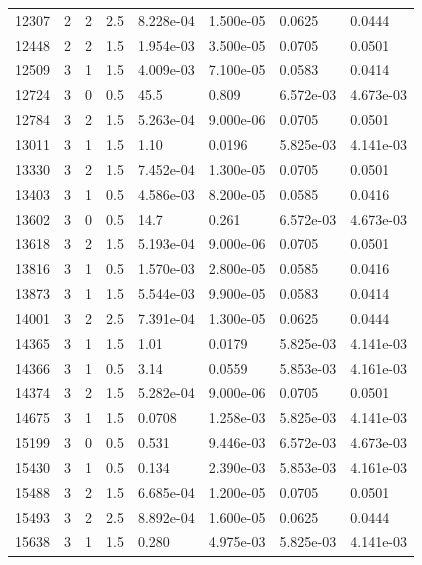 \documentclass[preview]{standalone}
\begin{document}
{{{\begin{tabular}{L{1.2cm}C{1.2cm} C{0.3cm}C{0.5cm} C{1.4cm}C{1.4cm} C{1.4cm}C{1.4cm}}
  12307  &     2  & 2     & 2.5 &  8.228e-04  & 1.500e-05  & 0.0625 &  0.0444   \\ 
  12448  &     2  & 2     & 1.5 &  1.954e-03  & 3.500e-05  & 0.0705 &  0.0501   \\ 
  12509  &     3  & 1     & 1.5 &  4.009e-03  & 7.100e-05  & 0.0583 &  0.0414   \\ 
  12724  &     3  & 0     & 0.5 &  45.5  & 0.809  & 6.572e-03 &  4.673e-03   \\ 
  12784  &     3  & 2     & 1.5 &  5.263e-04  & 9.000e-06  & 0.0705 &  0.0501   \\ 
  13011  &     3  & 1     & 1.5 &  1.10  & 0.0196  & 5.825e-03 &  4.141e-03   \\ 
  13330  &     3  & 2     & 1.5 &  7.452e-04  & 1.300e-05  & 0.0705 &  0.0501   \\ 
  13403  &     3  & 1     & 0.5 &  4.586e-03  & 8.200e-05  & 0.0585 &  0.0416   \\ 
  13602  &     3  & 0     & 0.5 &  14.7  & 0.261  & 6.572e-03 &  4.673e-03   \\ 
  13618  &     3  & 2     & 1.5 &  5.193e-04  & 9.000e-06  & 0.0705 &  0.0501   \\ 
  13816  &     3  & 1     & 0.5 &  1.570e-03  & 2.800e-05  & 0.0585 &  0.0416   \\ 
  13873  &     3  & 1     & 1.5 &  5.544e-03  & 9.900e-05  & 0.0583 &  0.0414   \\ 
  14001  &     3  & 2     & 2.5 &  7.391e-04  & 1.300e-05  & 0.0625 &  0.0444   \\ 
  14365  &     3  & 1     & 1.5 &  1.01  & 0.0179  & 5.825e-03 &  4.141e-03   \\ 
  14366  &     3  & 1     & 0.5 &  3.14  & 0.0559  & 5.853e-03 &  4.161e-03   \\ 
  14374  &     3  & 2     & 1.5 &  5.282e-04  & 9.000e-06  & 0.0705 &  0.0501   \\ 
  14675  &     3  & 1     & 1.5 &  0.0708  & 1.258e-03  & 5.825e-03 &  4.141e-03   \\ 
  15199  &     3  & 0     & 0.5 &  0.531  & 9.446e-03  & 6.572e-03 &  4.673e-03   \\ 
  15430  &     3  & 1     & 0.5 &  0.134  & 2.390e-03  & 5.853e-03 &  4.161e-03   \\ 
  15488  &     3  & 2     & 1.5 &  6.685e-04  & 1.200e-05  & 0.0705 &  0.0501   \\ 
  15493  &     3  & 2     & 2.5 &  8.892e-04  & 1.600e-05  & 0.0625 &  0.0444   \\ 
  15638  &     3  & 1     & 1.5 &  0.280  & 4.975e-03  & 5.825e-03 &  4.141e-03   \\ 

\end{tabular}}}}
\end{document}
